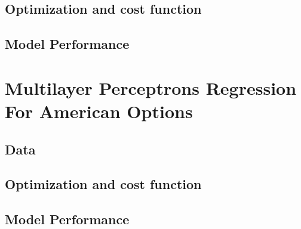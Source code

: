 
\subsection{Optimization and cost function}

\subsection{Model Performance}


\section{Multilayer Perceptrons Regression For American Options}


\subsection{Data}

\subsection{Optimization and cost function}

\subsection{Model Performance}

